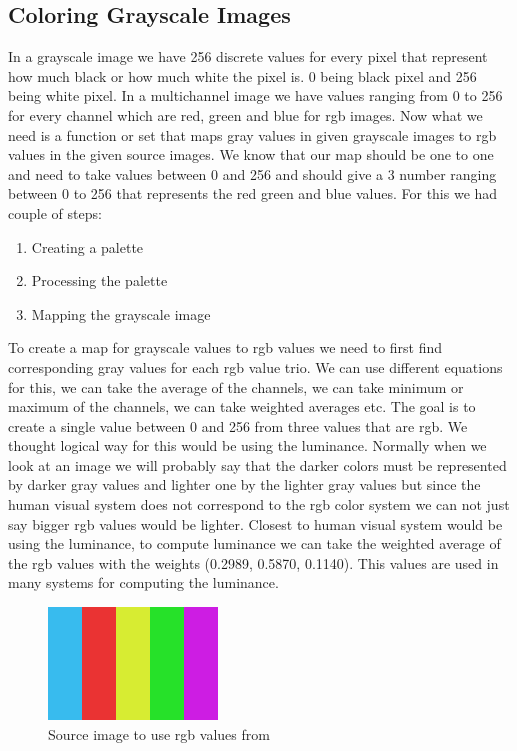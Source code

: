 \documentclass[conference]{IEEEtran}
\begin{document}
\subsection{Coloring Grayscale Images}
In a grayscale image we have 256 discrete values for every pixel that represent how much black or how much white the pixel is. 0 being black pixel and 256 being white pixel. In a multichannel image we have values ranging from 0 to 256 for every channel which are red, green and blue for rgb images. Now what we need is a function or set that maps gray values in given grayscale images to rgb values in the given source images. We know that our map should be one to one and need to take values between 0 and 256 and should give a 3 number ranging between 0 to 256 that represents the red green and blue values. For this we had couple of steps:
\begin{enumerate}
    \item Creating a palette
    \item Processing the palette
    \item Mapping the grayscale image
\end{enumerate}

To create a map for grayscale values to rgb values we need to first find corresponding gray values for each rgb value trio. We can use different equations for this, we can take the average of the channels, we can take minimum or maximum of the channels, we can take weighted averages etc. The goal is to create a single value between 0 and 256 from three values that are rgb. We thought logical way for this would be using the luminance. Normally when we look at an image we will probably say that the darker colors must be represented by darker gray values and lighter one by the lighter gray values but since the human visual system does not correspond to the rgb color system we can not just say bigger rgb values would be lighter. Closest to human visual system would be using the luminance, to compute luminance we can take the weighted average of the rgb values with the weights (0.2989, 0.5870, 0.1140). This values are used in many systems for computing the luminance. 

\begin{figure}[H]
    \centering
    \includegraphics[width=0.4\textwidth]{resources/4_source.png}
    \caption{Source image to use rgb values from}
    \label{fig:image_4_source}
\end{figure}
\end{document}
